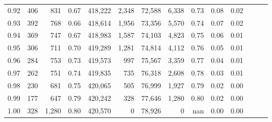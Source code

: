 \begin{tabular}{rrrrrrrrrrrrrr}
0.92 &    406 &    831 &  0.67 &  418,222 &    2,348 &  72,588 &   6,338 &  0.73 &  0.08 &      0.02 \\
0.93 &    392 &    768 &  0.66 &  418,614 &    1,956 &  73,356 &   5,570 &  0.74 &  0.07 &      0.02 \\
0.94 &    369 &    747 &  0.67 &  418,983 &    1,587 &  74,103 &   4,823 &  0.75 &  0.06 &      0.01 \\
0.95 &    306 &    711 &  0.70 &  419,289 &    1,281 &  74,814 &   4,112 &  0.76 &  0.05 &      0.01 \\
0.96 &    284 &    753 &  0.73 &  419,573 &      997 &  75,567 &   3,359 &  0.77 &  0.04 &      0.01 \\
0.97 &    262 &    751 &  0.74 &  419,835 &      735 &  76,318 &   2,608 &  0.78 &  0.03 &      0.01 \\
0.98 &    230 &    681 &  0.75 &  420,065 &      505 &  76,999 &   1,927 &  0.79 &  0.02 &      0.00 \\
0.99 &    177 &    647 &  0.79 &  420,242 &      328 &  77,646 &   1,280 &  0.80 &  0.02 &      0.00 \\
1.00 &    328 &  1,280 &  0.80 &  420,570 &        0 &  78,926 &       0 &   nan &  0.00 &      0.00 \\
\bottomrule
\end{tabular}
